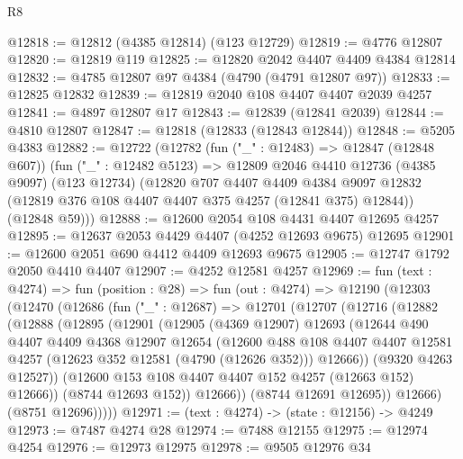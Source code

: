 \begin{lexlean}{R8}
\begin{coremodule}
@12818 := @12812 (@4385 @12814) (@123 @12729)
@12819 := @4776 @12807
@12820 := @12819 @119
@12825 := @12820 @2042 @4407 @4409 @4384 @12814
@12832 := @4785 @12807 @97 @4384 (@4790 (@4791 @12807 @97))
@12833 := @12825 @12832
@12839 := @12819 @2040 @108 @4407 @4407 @2039 @4257
@12841 := @4897 @12807 @17
@12843 := @12839 (@12841 @2039)
@12844 := @4810 @12807
@12847 := @12818 (@12833 (@12843 @12844))
@12848 := @5205 @4383
@12882 := @12722
    (@12782
      (fun ("_" : @12483) => @12847 (@12848 @607))
      (fun ("_" : @12482 @5123) =>
      @12809
        @2046
        @4410
        @12736
        (@4385 @9097)
        (@123 @12734)
        (@12820
          @707
          @4407
          @4409
          @4384
          @9097
          @12832
          (@12819 @376 @108 @4407 @4407 @375 @4257 (@12841 @375) @12844))
        (@12848 @59)))
@12888 := @12600 @2054 @108 @4431 @4407 @12695 @4257
@12895 := @12637 @2053 @4429 @4407 (@4252 @12693 @9675) @12695
@12901 := @12600 @2051 @690 @4412 @4409 @12693 @9675
@12905 := @12747 @1792 @2050 @4410 @4407
@12907 := @4252 @12581 @4257
@12969 := fun (text : @4274) =>
  fun (position : @28) =>
  fun (out : @4274) =>
  @12190
    (@12303
      (@12470
        (@12686
          (fun ("_" : @12687) =>
          @12701
            (@12707
              (@12716
                (@12882
                  (@12888
                    (@12895
                      (@12901
                        (@12905
                          (@4369 @12907)
                          @12693
                          (@12644
                            @490
                            @4407
                            @4409
                            @4368
                            @12907
                            @12654
                            (@12600
                              @488
                              @108
                              @4407
                              @4407
                              @12581
                              @4257
                              (@12623 @352 @12581 (@4790 (@12626 @352)))
                              @12666))
                          (@9320 @4263 @12527))
                        (@12600 @153 @108 @4407 @4407 @152 @4257 (@12663 @152) @12666))
                      (@8744 @12693 @152))
                    @12666))
                (@8744 @12691 @12695))
              @12666)
            (@8751 @12696)))))
@12971 := (text : @4274) -> (state : @12156) -> @4249
@12973 := @7487 @4274 @28
@12974 := @7488 @12155
@12975 := @12974 @4254
@12976 := @12973 @12975
@12978 := @9505 @12976 @34

\end{coremodule}
\end{lexlean}
